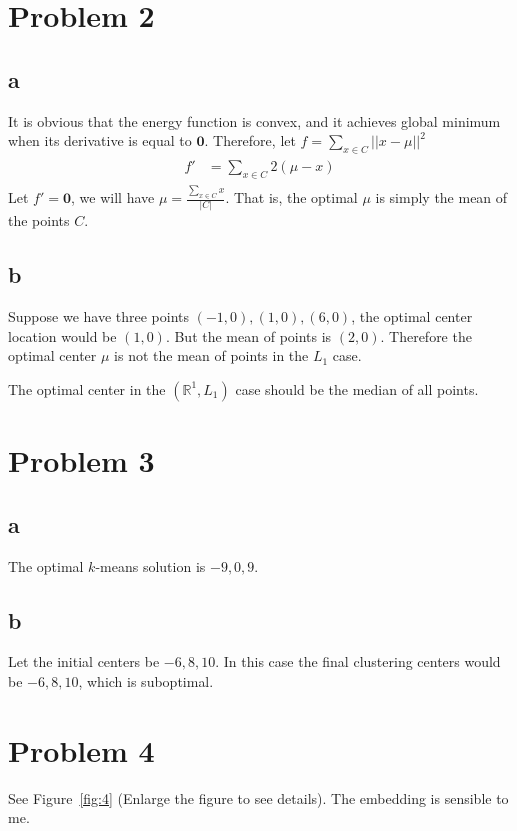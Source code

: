 \documentclass[a4paper,11pt]{article}
\theoremstyle{mytheor}
\begin{document}
\section*{Problem 2}
\subsection*{a}
It is obvious that the energy function is convex, and it achieves global minimum when its derivative is equal to $\mathbf{0}$. Therefore, let $f = \sum\limits_{x\in C}|| x - \mu||^2$
\begin{align}
    \begin{split}
        f' &= \sum\limits_{x \in C} 2 (\mu - x)
    \end{split}
\end{align}
Let $f' = \mathbf{0}$, we will have $\mu = \frac{\sum\limits_{x \in C} x} {|C|}$.
That is, the optimal $\mu$ is simply the mean of the points $C$.

\subsection*{b}
Suppose we have three points $(-1, 0), (1, 0), (6, 0)$, the optimal center location would be $(1,0)$. But the mean of
points is $(2, 0)$. Therefore the optimal center $\mu$ is not the mean of points in the $L_1$ case.

The optimal center in the $(\mathbb{R}^1, L_1)$ case should be the median of all points.

\section*{Problem 3}
\subsection*{a}
The optimal $k$-means solution is $-9, 0, 9$.

\subsection*{b}
Let the initial centers be $-6, 8 , 10$. In this case the final clustering
centers would be $-6, 8, 10$, which is suboptimal.

\section*{Problem 4}
See Figure~\ref{fig:4} (Enlarge the figure to see details). The embedding
is sensible to me.
\end{document}
